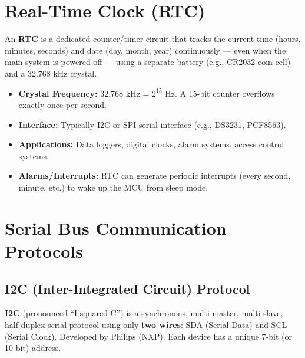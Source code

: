 \documentclass[12pt,a4paper]{article}
\begin{document}
\section{Real-Time Clock (RTC)}

\begin{tcolorbox}[defbox, title={\textbf{Real-Time Clock (RTC)}}]
An \textbf{RTC} is a dedicated counter/timer circuit that tracks the current time (hours, minutes, seconds) and date (day, month, year) continuously --- even when the main system is powered off --- using a separate battery (e.g., CR2032 coin cell) and a 32.768 kHz crystal.
\end{tcolorbox}

\begin{itemize}[leftmargin=*, itemsep=3pt]
  \item \textbf{Crystal Frequency:} 32.768 kHz = $2^{15}$ Hz. A 15-bit counter overflows exactly once per second.
  \item \textbf{Interface:} Typically I2C or SPI serial interface (e.g., DS3231, PCF8563).
  \item \textbf{Applications:} Data loggers, digital clocks, alarm systems, access control systems.
  \item \textbf{Alarms/Interrupts:} RTC can generate periodic interrupts (every second, minute, etc.) to wake up the MCU from sleep mode.
\end{itemize}

\section{Serial Bus Communication Protocols}

\subsection{I2C (Inter-Integrated Circuit) Protocol}

\begin{tcolorbox}[defbox, title={\textbf{I2C Protocol}}]
\textbf{I2C} (pronounced ``I-squared-C'') is a synchronous, multi-master, multi-slave, half-duplex serial protocol using only \textbf{two wires}: SDA (Serial Data) and SCL (Serial Clock). Developed by Philips (NXP). Each device has a unique 7-bit (or 10-bit) address.
\end{tcolorbox}
\end{document}

